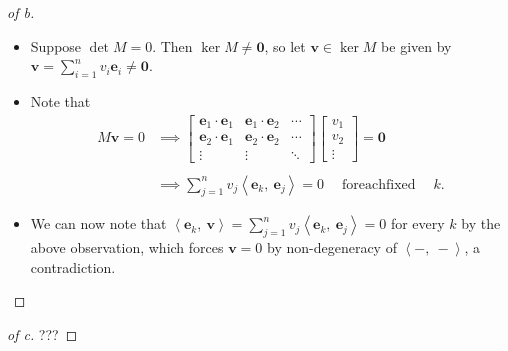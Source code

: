 \begin{solution}
\begin{proof}[of b]
\begin{itemize}
\item
  Suppose \(\det M = 0\). Then \(\ker M \neq \mathbf{0}\), so let
  \(\mathbf{v} \in \ker M\) be given by
  \(\mathbf{v} = \sum_{i=1}^n v_i \mathbf{e}_i \neq \mathbf{0}\).
\item
  Note that
  \begin{align*}
  M\mathbf{v} = 0 &\implies
  \left[
  \begin{array}{ccc}
  \mathbf{e}_1 \cdot \mathbf{e}_1 & \mathbf{e}_1 \cdot \mathbf{e}_2 & \cdots \\
  \mathbf{e}_2 \cdot \mathbf{e}_1 & \mathbf{e}_2 \cdot \mathbf{e}_2 & \cdots \\
  \vdots & \vdots & \ddots
  \end{array}
  \right]
  \left[\begin{array}{c}
  v_1 \\ v_2 \\ \vdots
  \end{array}\right] = \mathbf{0} \\ \\
  &\implies \sum_{j=1}^n v_j{\left\langle {\mathbf{e}_k},~{\mathbf{e}_j} \right\rangle} = 0 {\quad \operatorname{for each fixed} \quad} k
  .\end{align*}
\item
  We can now note that
  \({\left\langle {\mathbf{e}_k},~{\mathbf{v}} \right\rangle} = \sum_{j=1}^n v_j {\left\langle {\mathbf{e}_k},~{\mathbf{e}_j} \right\rangle} = 0\)
  for every \(k\) by the above observation, which forces
  \(\mathbf{v} = 0\) by non-degeneracy of
  \({\left\langle {{-}},~{{-}} \right\rangle}\), a contradiction.
\end{itemize}

\end{proof}

\begin{proof}[of c]

\envlist

???


\end{proof}

\end{solution}

